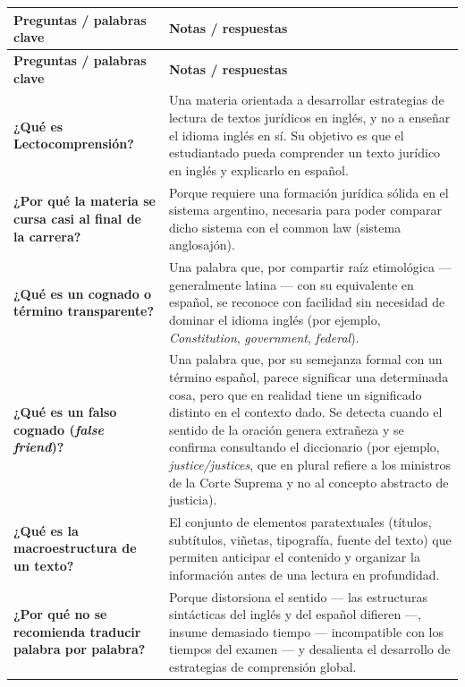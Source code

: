 \documentclass[12pt,oneside]{book}
\begin{document}
\begin{longtable}{
    >{\raggedright\arraybackslash}p{}
    >{\raggedright\arraybackslash}p{}
}
\toprule
\textbf{Preguntas / palabras clave} & \textbf{Notas / respuestas} \\
\midrule
\endfirsthead
\toprule
\textbf{Preguntas / palabras clave} & \textbf{Notas / respuestas} \\
\midrule
\endhead

\textbf{¿Qué es Lectocomprensión?} &
Una materia orientada a desarrollar estrategias de lectura de textos jurídicos en inglés, y no a enseñar el idioma inglés en sí. Su objetivo es que el estudiantado pueda comprender un texto jurídico en inglés y explicarlo en español. \\

\textbf{¿Por qué la materia se cursa casi al final de la carrera?} &
Porque requiere una formación jurídica sólida en el sistema argentino, necesaria para poder comparar dicho sistema con el common law (sistema anglosajón). \\

\textbf{¿Qué es un cognado o término transparente?} &
Una palabra que, por compartir raíz etimológica --- generalmente latina --- con su equivalente en español, se reconoce con facilidad sin necesidad de dominar el idioma inglés (por ejemplo, \textit{Constitution}, \textit{government}, \textit{federal}). \\

\textbf{¿Qué es un falso cognado (\textit{false friend})?} &
Una palabra que, por su semejanza formal con un término español, parece significar una determinada cosa, pero que en realidad tiene un significado distinto en el contexto dado. Se detecta cuando el sentido de la oración genera extrañeza y se confirma consultando el diccionario (por ejemplo, \textit{justice/justices}, que en plural refiere a los ministros de la Corte Suprema y no al concepto abstracto de justicia). \\

\textbf{¿Qué es la macroestructura de un texto?} &
El conjunto de elementos paratextuales (títulos, subtítulos, viñetas, tipografía, fuente del texto) que permiten anticipar el contenido y organizar la información antes de una lectura en profundidad. \\

\textbf{¿Por qué no se recomienda traducir palabra por palabra?} &
Porque distorsiona el sentido --- las estructuras sintácticas del inglés y del español difieren ---, insume demasiado tiempo --- incompatible con los tiempos del examen --- y desalienta el desarrollo de estrategias de comprensión global. \\


\end{longtable}
\end{document}
